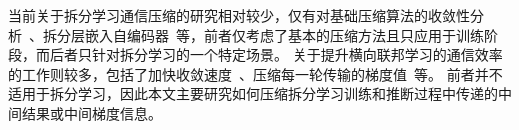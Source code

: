 当前关于拆分学习通信压缩的研究相对较少，仅有对基础压缩算法的收敛性分析~\cite{castiglia2022compressed_vfl}、拆分层嵌入自编码器~\cite{ayad202vfl}等，前者仅考虑了基本的压缩方法且只应用于训练阶段，而后者只针对拆分学习的一个特定场景。
%
关于提升横向联邦学习的通信效率的工作则较多，包括了加快收敛速度~\cite{karimireddy2020scaffold,reddi2020fed_opt}、压缩每一轮传输的梯度值~\cite{wen2017terngrad,aji2017sparse,sattler2019sparse_binary}等。
%
前者并不适用于拆分学习，因此本文主要研究如何压缩拆分学习训练和推断过程中传递的中间结果或中间梯度信息。
%

